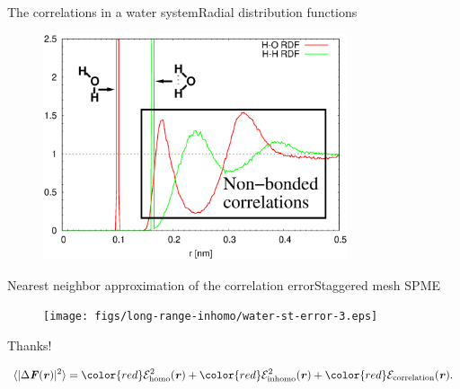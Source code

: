 \documentclass{beamer}
\newcommand{\redc}[1]{{\color{red} #1}}
\newcommand{\bluec}[1]{{\color{blue} #1}}
\newcommand{\vect}[1]{\textbf{\textit{#1}}}
\begin{document}
\begin{frame}{The correlations in a water system}{Radial distribution functions}
  \begin{figure}
    \centering
    \includegraphics[width=0.8\textwidth]{figs/long-range-nna/rdf-corr-h2o-gr.eps}
  \end{figure}
\end{frame}


\begin{frame}{Nearest neighbor approximation of the correlation error}{Staggered mesh SPME}
  \begin{figure}
    \centering
    \texttt{[image: figs/long-range-inhomo/water-st-error-3.eps]}
  \end{figure}  
\end{frame}


\begin{frame}
  \vfill
  \centerline{ \Huge
    Thanks!  }
  \vfill
  \bluec{
    \begin{align*} \nonumber
      \langle\vert\Delta\vect F(\vect r)\vert^2\rangle
      = 
      \redc{\mathcal E^2_{\textrm{homo}}(\vect r)} +
      \redc{\mathcal E^2_{\textrm{inhomo}}(\vect r)} +
      \redc{\mathcal E_{\textrm{correlation}}(\vect r)}.
    \end{align*}
  }
\end{frame}
\end{document}
